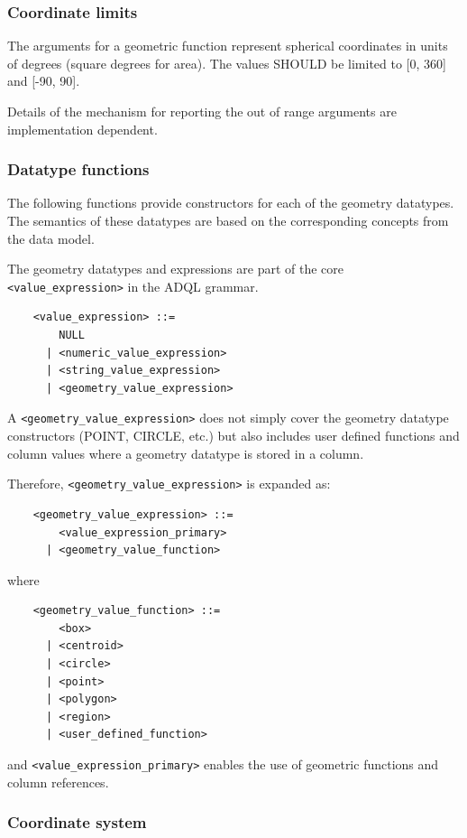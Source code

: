 \documentclass[11pt,a4paper]{ivoa}
\begin{document}
\subsubsection{Coordinate limits}
\label{sec:functions.geom.limits}

The arguments for a geometric function represent spherical coordinates
in units of degrees (square degrees for area).
The values SHOULD be limited to [0, 360] and [-90, 90].

Details of the mechanism for reporting the out of range arguments are
implementation dependent.

\subsubsection{Datatype functions}
\label{sec:functions.geom.type}

The following functions provide constructors for each of the geometry datatypes.
The semantics of these datatypes are based on the corresponding
concepts from the \STCSpec{} data model.

The geometry datatypes and expressions are part of the core \verb:<value_expression>:
in the ADQL grammar.

\begin{verbatim}
    <value_expression> ::=
        NULL
      | <numeric_value_expression>
      | <string_value_expression>
      | <geometry_value_expression>
\end{verbatim}

A \verb:<geometry_value_expression>: does not simply cover the geometry datatype
constructors (POINT, CIRCLE, etc.) but also includes user defined functions and
column values where a geometry datatype is stored in a column.

Therefore, \verb:<geometry_value_expression>: is expanded as:
\begin{verbatim}
    <geometry_value_expression> ::=
        <value_expression_primary>
      | <geometry_value_function>
\end{verbatim}
\noindent
where
\begin{verbatim}
    <geometry_value_function> ::=
        <box>
      | <centroid>
      | <circle>
      | <point>
      | <polygon>
      | <region>
      | <user_defined_function>
\end{verbatim}
and \verb:<value_expression_primary>: enables the use of geometric functions
and column references.

\subsubsection{Coordinate system}
\label{sec:geom.coordsys.param}
\end{document}
